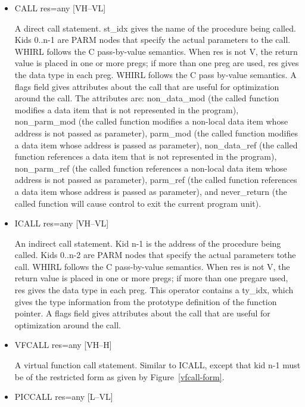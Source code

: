 \documentclass{article}
\begin{document}
\begin{itemize}

%
\item  CALL res=any \hfill [VH--VL]

A direct call statement. st\_idx gives the name of the procedure
being called. Kids 0..n-1 are
%
PARM nodes that specify the actual parameters to the call. WHIRL
follows the C pass-by-value semantics. When res is not V, 
the return value is placed in one or more pregs; if more than
one preg are used, res gives the data type in each preg. WHIRL
follows the C pass by-value semantics. A flags field gives attributes
about the call that are useful for optimization around the call.
The attributes are: non\_data\_mod (the called function modifies a
data item that is not represented in the program), non\_parm\_mod (the
called function modifies a non-local data item whose address is
not passed as parameter), parm\_mod (the called
function modifies a data item whose address is passed as
parameter), non\_data\_ref (the called function references a data item
that is not represented in the program), non\_parm\_ref (the called
function references a non-local data item whose address is not passed
as parameter), parm\_ref (the called function references a data item
whose address is passed as parameter), and never\_return (the called
function will cause control to exit the current program unit).

%
\item  ICALL res=any \hfill [VH--VL]

An indirect call statement. Kid n-1 is the address of the procedure
being called. Kids 0..n-2 are
%
PARM nodes that specify the actual parameters tothe call. WHIRL
follows the C pass-by-value semantics. When res is not
V, the return value is placed in one or more pregs; if more than
one pregare used, res gives the data type in each preg. This operator
contains a ty\_idx, which gives the type information from the
prototype definition of the function pointer. A flags field gives
attributes about the call that are useful for optimization around
the call. 

%
\item  VFCALL res=any \hfill [VH--H]

A virtual function call statement. Similar to ICALL, except that
kid n-1 must be of the restricted form as given by
Figure~\ref{vfcall-form}.

\item
{}%
PICCALL res=any [L--VL]


\end{itemize}
\end{document}
